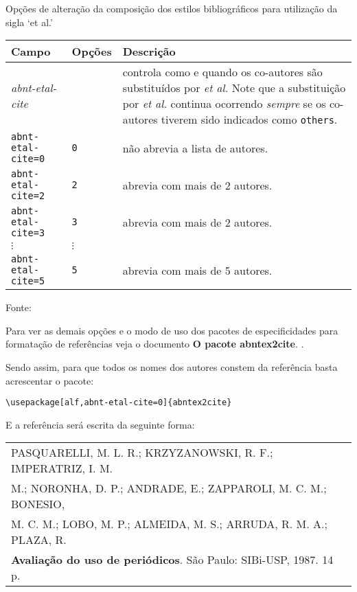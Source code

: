\begin{quadro}[H]
	\caption{\label{quadro-opcoes-etal}Opções de alteração da composição dos estilos bibliográficos para utilização da sigla ‘et al.’}
		\begin{tabular}{|p{4.0cm}|p{2.0cm}|p{8.5cm}|}
			\hline
			\textbf{Campo} & \textbf{Opções} & \textbf{Descrição} \\ 
			\hline
			\emph{abnt-etal-cite} &  & controla como e quando os co-autores são
			substituídos por \emph{et al.}  Note que a substituição
			por \emph{et al.} continua ocorrendo \emph{sempre} se os co-autores tiverem sido indicados
			como \texttt{others}.\\
			\hline
			\texttt{abnt-etal-cite=0}&\texttt{0}& não abrevia a lista de autores.\\
			\hline
			\texttt{abnt-etal-cite=2}& \texttt{2} & abrevia com mais de 2 autores.\\
			\hline
			\texttt{abnt-etal-cite=3}& \texttt{3} & abrevia com mais de 2 autores.\\
			\hline
			$\vdots$ & $\vdots$ & \\
			\hline
			\texttt{abnt-etal-cite=5}& \texttt{5} & abrevia com mais de 5 autores.\\
			\hline
		\end{tabular}
	\begin{flushleft}
		Fonte: 
	\end{flushleft}	
\end{quadro}

Para ver as demais opções e o modo de uso dos pacotes de especificidades para formatação de referências veja o documento \textbf{O pacote abntex2cite}. \cite{abnetxcite}.

Sendo assim, para que todos os nomes dos autores constem da referência basta acrescentar o pacote: 

\verb+\usepackage[alf,abnt-etal-cite=0]{abntex2cite}+

E a referência será escrita da seguinte forma: \\

\begin{tabular}{|l|c|} \hline
PASQUARELLI, M. L. R.; KRZYZANOWSKI, R. F.; IMPERATRIZ, I. M.\\
M.; NORONHA, D. P.; ANDRADE, E.; ZAPPAROLI, M. C. M.; BONESIO, \\
M. C. M.; LOBO, M. P.; ALMEIDA, M. S.; ARRUDA, R. M. A.; PLAZA, R. \\ \textbf{Avaliação do uso de periódicos}. São Paulo: SIBi-USP, 1987. 14 p.\\\hline
\end{tabular}\\

